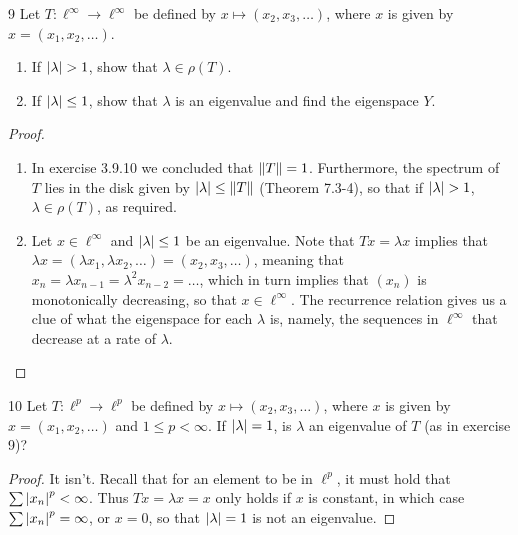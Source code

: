\begin{exercise}{9}
Let $T: \ell^\infty \to \ell^\infty$ be defined by $x \mapsto (x_2, x_3, \dots)$, where $x$ is given by $x = (x_1, x_2, \dots)$.
\begin{enumerate}
    \item If $\left\lvert \lambda\right\rvert > 1$, show that $\lambda \in \rho(T)$.
    \item If $\left\lvert \lambda\right\rvert \leq 1$, show that $\lambda$ is an eigenvalue and find the eigenspace $Y$.
\end{enumerate}
\end{exercise}
\begin{proof}
\begin{enumerate}
    \item In exercise 3.9.10 we concluded that $\left\lVert T\right\rVert = 1$.
    Furthermore, the spectrum of $T$ lies in the disk given by $\left\lvert \lambda\right\rvert \leq \left\lVert T\right\rVert$ (Theorem 7.3-4), so that if $\left\lvert \lambda\right\rvert > 1$, $\lambda \in \rho(T)$, as required.
    \item Let $x \in \ell^\infty$ and $\left\lvert \lambda\right\rvert \leq 1$ be an eigenvalue.
    Note that $T x = \lambda x$ implies that $\lambda x = (\lambda x_1, \lambda x_2, \dots) = (x_2, x_3, \dots)$, meaning that $x_n = \lambda x_{n-1} = \lambda^2 x_{n-2} = \dots$, which in turn implies that $(x_n)$ is monotonically decreasing, so that $x \in \ell^\infty$.
    The recurrence relation gives us a clue of what the eigenspace for each $\lambda$ is, namely, the sequences in $\ell^\infty$ that decrease at a rate of $\lambda$.
\end{enumerate}
\end{proof} 

\begin{exercise}{10}
Let $T: \ell^p \to \ell^p$ be defined by $x \mapsto (x_2, x_3, \dots)$, where $x$ is given by $x = (x_1, x_2, \dots)$ and $1 \leq p < \infty$.
If $\left\lvert \lambda\right\rvert = 1$, is $\lambda$ an eigenvalue of $T$ (as in exercise 9)?
\end{exercise}
\begin{proof}
It isn't.
Recall that for an element to be in $\ell^p$, it must hold that $\sum \left\lvert x_n\right\rvert^p < \infty$.
Thus $T x = \lambda x = x$ only holds if $x$ is constant, in which case $\sum \left\lvert x_n\right\rvert^p = \infty$, or $x = 0$, so that $\left\lvert \lambda\right\rvert = 1$ is not an eigenvalue.
\end{proof} 
